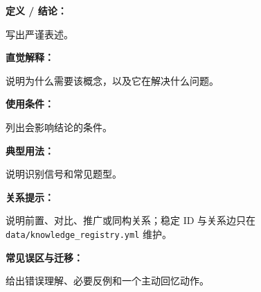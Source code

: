 
\par

\begin{knowledgeBox}
\textbf{定义 / 结论：}

写出严谨表述。

\textbf{直觉解释：}

说明为什么需要该概念，以及它在解决什么问题。

\textbf{使用条件：}

列出会影响结论的条件。

\textbf{典型用法：}

说明识别信号和常见题型。

\textbf{关系提示：}

说明前置、对比、推广或同构关系；稳定 ID 与关系边只在 \texttt{data/knowledge\_registry.yml} 维护。

\textbf{常见误区与迁移：}

给出错误理解、必要反例和一个主动回忆动作。
\end{knowledgeBox}
